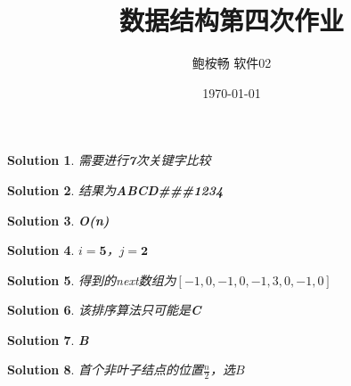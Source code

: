 \documentclass{article}
\title{数据结构第四次作业}
\author{鲍桉畅 \quad 软件02 \quad 2020012381}
\date{\today}
\begin{document}
\maketitle

\renewcommand{\proofname}{\indent\bf Proof}

\newcommand{\C}{\mathbb{C}}
\newcommand{\R}{\mathbb{R}}
\newcommand{\IM}{\mathbb{Im}}
\newcommand{\Ker}{\mathbb{Ker}}
\newcommand{\rd}{\mathrm{d}}

\newtheorem{definition}{Definition}
\newtheorem{theorem}{Theorem}
\newtheorem{lemma}{Lemma}
\newtheorem{remark}{Remark}
\newtheorem{proposition}{Proposition}
\newtheorem{corollary}{Corollary}
\newtheorem{example}{Example}
\newtheorem{solution}{Solution}

\begin{solution}
需要进行\textbf{7}次关键字比较
\end{solution}

\begin{solution}
结果为\textbf{ABCD\#\#\#1234}
\end{solution}

\begin{solution}
\textbf{O(n)}
\end{solution}


\begin{solution}
$i = \textbf{5}$，$j = \textbf{2}$
\end{solution}

\begin{solution}
得到的next数组为\textbf{$[-1,0,-1,0,-1,3,0,-1,0]$}
\end{solution}

\begin{solution}
该排序算法只可能是\textbf{C}
\end{solution}

\begin{solution}
\textbf{B}
\end{solution}

\begin{solution}
首个非叶子结点的位置$\frac{n}{2}$，选\textbf{$B$}
\end{solution}
\end{document}
